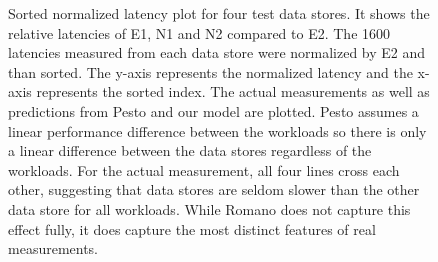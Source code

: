 \begin{figure}[!t]
\ContinuedFloat
\centering
{}
\captionsetup{format=myformat}
\caption{Sorted normalized latency plot for four test data stores.
It shows the relative latencies of E1, N1 and N2 compared to E2.
The 1600 latencies measured from each data store were normalized by E2 and than sorted.
The y-axis represents the normalized latency and the x-axis represents the sorted index.
The actual measurements as well as predictions from Pesto and our model are plotted.
Pesto assumes a linear performance difference between the workloads so there is only a linear difference between the data stores regardless of the workloads.
For the actual measurement, all four lines cross each other, suggesting that data stores are seldom slower than the other data store for all workloads.
While Romano does not capture this effect fully, it does capture the most distinct features of real measurements.
}
\label{sortedLatency}
\end{figure}

